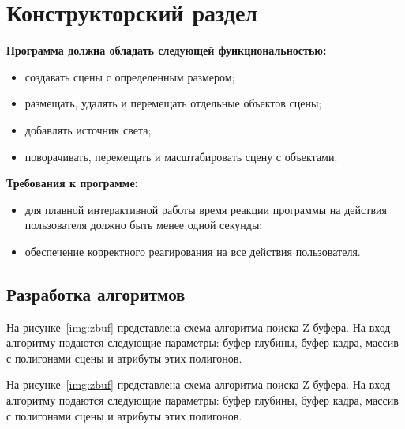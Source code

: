 \chapter{Конструкторский раздел}

\textbf{Программа должна обладать следующей функциональностью:}
\begin{itemize}
	\item создавать сцены с определенным размером;
	\item размещать, удалять и перемещать отдельные объектов сцены;
	\item добавлять источник света;
	\item поворачивать, перемещать и масштабировать сцену с объектами.
\end{itemize}

\textbf{Требования к программе: }
\begin{itemize}
	\item для плавной интерактивной работы время реакции программы на действия пользователя должно быть менее одной секунды;
	\item обеспечение корректного реагирования на все действия пользователя.
\end{itemize}

\section{Разработка алгоритмов}

На рисунке~\ref{img:zbuf} представлена схема алгоритма поиска Z-буфера.
На вход алгоритму подаются следующие параметры: буфер глубины, буфер кадра,
массив с полигонами сцены и атрибуты этих полигонов.

На рисунке~\ref{img:zbuf} представлена схема алгоритма поиска Z-буфера.
На вход алгоритму подаются следующие параметры: буфер глубины, буфер кадра,
массив с полигонами сцены и атрибуты этих полигонов.


